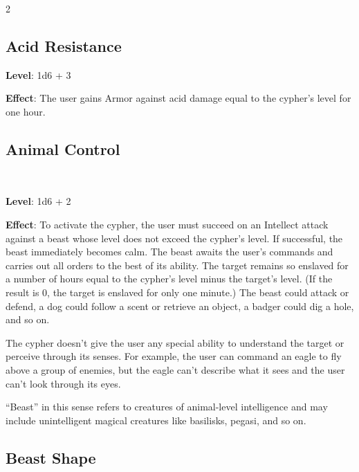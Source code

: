 \begin{multicols}{2}

\subsection{Acid Resistance}

\textbf{Level}: 1d6 + 3 

\textbf{Effect}: The user gains Armor against acid damage equal to the cypher’s level for one hour. 

\subsection{Animal Control} 

\textbf{Level}: 1d6 + 2 

\textbf{Effect}: To activate the cypher, the user must succeed on an Intellect attack against a beast whose level does not exceed the cypher’s level. If successful, the beast immediately becomes calm. The beast awaits the user’s commands and carries out all orders to the best of its ability. The target remains so enslaved for a number of hours equal to the cypher’s level minus the target’s level. (If the result is 0, the target is enslaved for only one minute.) The beast could attack or defend, a dog could follow a scent or retrieve an object, a badger could dig a hole, and so on. 

The cypher doesn’t give the user any special ability to understand the target or perceive through its senses. For example, the user can command an eagle to fly above a group of enemies, but the eagle can’t describe what it sees and the user can’t look through its eyes. 

“Beast” in this sense refers to creatures of animal-level intelligence and may include unintelligent magical creatures like basilisks, pegasi, and so on.

\subsection{Beast Shape}


\end{multicols}
